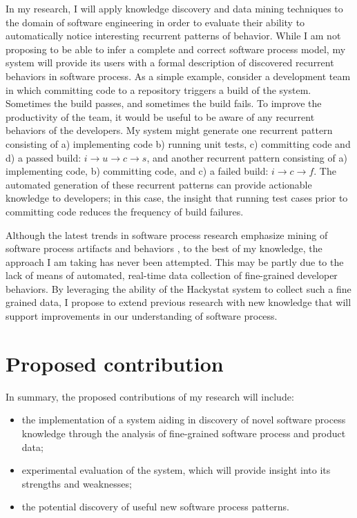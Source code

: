 In my research, I will apply knowledge discovery and data mining techniques to the domain of software engineering in order to evaluate their ability to automatically notice interesting recurrent patterns of behavior. While I am not proposing to be able to infer a complete and correct software process model, my system will provide its users with a formal description of discovered recurrent behaviors in software process. As a simple example, consider a development team in which committing code to a repository triggers a build of the system. Sometimes the build passes, and sometimes the build fails. To improve the productivity of the team, it would be useful to be aware of any recurrent behaviors of the developers. My system might generate one recurrent pattern consisting of a) implementing code b) running unit tests, c) committing code and d) a passed build: $i \rightarrow u \rightarrow c \rightarrow s $, and another recurrent pattern consisting of a) implementing code, b) committing code, and c) a failed build: $i \rightarrow c \rightarrow f $. The automated generation of these recurrent patterns can provide actionable knowledge to developers; in this case, the insight that running test cases prior to committing code reduces the frequency of build failures.

Although the latest trends in software process research emphasize mining of software process artifacts and behaviors \cite{citeulike:5043664} \cite{citeulike:1885717} \cite{citeulike:5112229} \cite{citeulike:1885717}, to the best of my knowledge, the approach I am taking has never been attempted. This may be partly due to the lack of means of automated, real-time data collection of fine-grained developer behaviors. By leveraging the ability of the Hackystat system \cite{citeulike:4041809} to collect such a fine grained data, I propose to extend previous research with new knowledge that will support improvements in our understanding of software process.

\section{Proposed contribution}
In summary, the proposed contributions of my research will include: 
\begin{itemize}
	\item the implementation of a system aiding in discovery of novel software process knowledge through the analysis of fine-grained software process and product data;
	\item experimental evaluation of the system, which will provide insight into its strengths and weaknesses;
	\item the potential discovery of useful new software process patterns.
\end{itemize}

